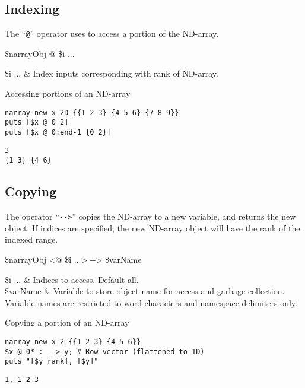 \clearpage
\subsection{Indexing}
The ``\texttt{@}'' operator uses  to access a portion of the ND-array. 
\begin{syntax}
 \$narrayObj @ \$i ...
\end{syntax}
\begin{args}
\$i ... & Index inputs corresponding with rank of ND-array. \\
\end{args}

\begin{example}{Accessing portions of an ND-array}
\begin{lstlisting}
narray new x 2D {{1 2 3} {4 5 6} {7 8 9}}
puts [$x @ 0 2]
puts [$x @ 0:end-1 {0 2}]
\end{lstlisting}
\tcblower
\begin{lstlisting}
3
{1 3} {4 6}
\end{lstlisting}
\end{example}

\subsection{Copying}
The operator ``\texttt{-{}->}'' copies the ND-array to a new variable, and returns the new object.
If indices are specified, the new ND-array object will have the rank of the indexed range.
\begin{syntax}
 \$narrayObj <@ \$i ...> -{}-> \$varName
\end{syntax}
\begin{args}
\$i ... & Indices to access. Default all. \\
\$varName & Variable to store object name for access and garbage collection. 
Variable names are restricted to word characters and namespace delimiters only.
\end{args}

\begin{example}{Copying a portion of an ND-array}
\begin{lstlisting}
narray new x 2 {{1 2 3} {4 5 6}}
$x @ 0* : --> y; # Row vector (flattened to 1D)
puts "[$y rank], [$y]"
\end{lstlisting}
\tcblower
\begin{lstlisting}
1, 1 2 3
\end{lstlisting}
\end{example}
\clearpage
